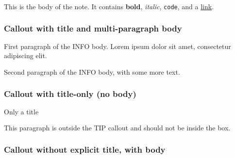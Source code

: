 \begin{tcolorbox}[breakable,colback=ocGryBack,colframe=ocGryFrame,coltitle=ocGryTitle,left=3mm,boxed title style={left=1mm},title={\hspace*{-2.5mm}\iconNote\; A simple NOTE callout}]

This is the body of the note. It contains \textbf{bold}, \emph{italic},
\texttt{code}, and a \href{https://example.com}{link}.

\end{tcolorbox}

\subsubsection{Callout with title and multi-paragraph
body}\label{callout-with-title-and-multi-paragraph-body}

\begin{tcolorbox}[breakable,colback=ocGryBack,colframe=ocGryFrame,coltitle=ocGryTitle,left=3mm,boxed title style={left=1mm},title={\hspace*{-2.5mm}\iconInfo\; Info with multi-paragraph body}]

First paragraph of the INFO body. Lorem ipsum dolor sit amet,
consectetur adipiscing elit.

Second paragraph of the INFO body, with some more text.

\end{tcolorbox}

\subsubsection{Callout with title-only (no
body)}\label{callout-with-title-only-no-body}

\vspace{2mm}

\noindent\begin{tcolorbox}[colback=ocYelBack,colframe=ocYelFrame,coltitle=ocYelTitle,left=3mm,width=\linewidth,boxrule=0pt]

\hspace*{-2.5mm}\iconHint\; Only a title

\end{tcolorbox}

This paragraph is outside the TIP callout and should not be inside the
box.

\subsubsection{Callout without explicit title, with
body}\label{callout-without-explicit-title-with-body}


